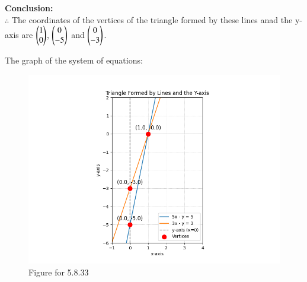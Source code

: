 \documentclass[journal,12pt,onecolumn]{IEEEtran}
\theoremstyle{remark}
\begin{document}
\textbf{Conclusion: }\\
$\therefore$ The coordinates of the vertices of the triangle formed by these lines anad the y-axis are $\begin{pmatrix}1\\0\end{pmatrix}$, $\begin{pmatrix}0\\-5\end{pmatrix}$ and $\begin{pmatrix}0\\-3\end{pmatrix}$.

The graph of the system of equations:\\

\begin{figure}[H]
    \centering
    \includegraphics[width=0.75\columnwidth]{figs/1.png}
    \caption{Figure for 5.8.33}
\end{figure}
\end{document}
